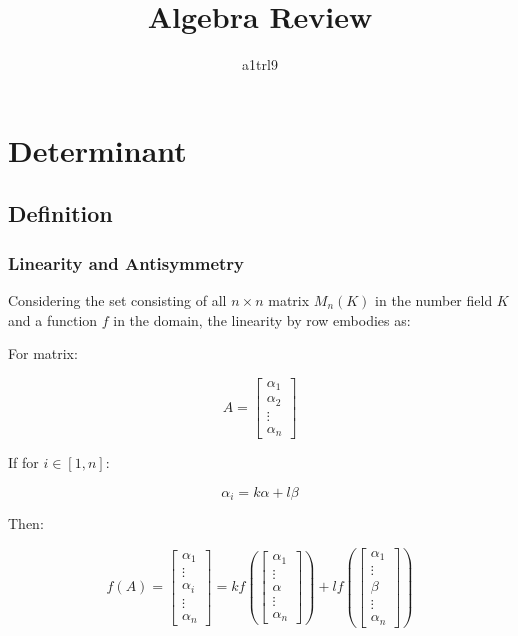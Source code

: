 \documentclass{article}
\author{a1trl9}
\title{Algebra Review}
\date{}
\begin{document}
\maketitle

\section{Determinant}

\subsection{Definition}

\subsubsection{Linearity and Antisymmetry}

Considering the set consisting of all 
\(n \times n\) matrix \(M_n(K)\) in the number field \(K\) and
a function \(f\) in the domain,
the linearity by row embodies as:

For matrix:

\begin{equation*}
A=
\begin{bmatrix}
    \alpha_1 \\
    \alpha_2 \\
    \vdots \\
    \alpha_n
\end{bmatrix}
\end{equation*}

If for \(i \in [1, n]\):

\begin{equation*}
    \alpha_i=k\alpha+l\beta
\end{equation*}

Then:

\begin{equation}
f(A)=
\begin{bmatrix}
    \alpha_1 \\
    \vdots \\
    \alpha_i \\
    \vdots \\
    \alpha_n
\end{bmatrix} =
kf(
\begin{bmatrix}
    \alpha_1 \\
    \vdots \\
    \alpha \\
    \vdots \\
    \alpha_n
\end{bmatrix}) + lf(
\begin{bmatrix}
    \alpha_1 \\
    \vdots \\
    \beta \\
    \vdots \\
    \alpha_n
\end{bmatrix}
)
\end{equation}
\end{document}
